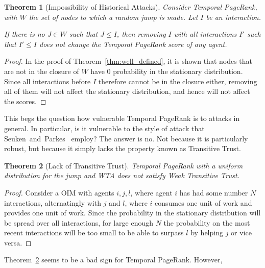 \documentclass[a4paper,11pt]{book}
\newtheorem{theorem}{Theorem}
\theoremstyle{definition}
\begin{document}
\begin{theorem}[Impossibility of Historical Attacks]
    Consider Temporal PageRank, with $W$ the set of nodes to which a random jump is made. Let
    $I$ be an interaction.

    If there is no $J \in W$ such that $J \leq I$, then removing $I$ with all
    interactions $I'$ such that $I' \leq I$ does not change the Temporal PageRank
    score of any agent.
    \label{}
\end{theorem}

\begin{proof}
    In the proof of Theorem~\ref{thm:well_defined}, it is shown that nodes that are not in the closure
    of $W$ have $0$ probability in the stationary distribution. Since all interactions before $I$ therefore
    cannot be in the closure either, removing all of them will not affect the stationary distribution, and
    hence will not affect the scores.
\end{proof}

This begs the question how vulnerable Temporal PageRank is to attacks in general. In particular, is
it vulnerable to the style of attack that Seuken~and~Parkes~\cite{seuken2014sybil} employ? The
answer is no. Not because it is particularly robust, but because it simply lacks the property
known as Transitive Trust.

\begin{theorem}[Lack of Transitive Trust]
    Temporal PageRank with a uniform distribution for the jump and WTA does not satisfy Weak Transitive Trust.
    \label{thm:no_trans_trust}
\end{theorem}

\begin{proof}
    Consider a OIM with agents $i, j, l$, where agent $i$ has had some number $N$ interactions,
    alternatingly with $j$ and $l$, where $i$ consumes one unit of work and provides
    one unit of work. Since the probability in the stationary distribution will
    be spread over all interactions, for large enough $N$ the probability on the most recent
    interactions will be too small to be able to surpass $l$ by helping $j$ or vice versa.
\end{proof}

Theorem~\ref{thm:no_trans_trust} seems to be a bad sign for Temporal PageRank. However, 
\end{document}
